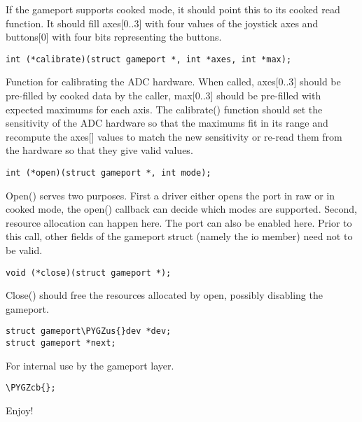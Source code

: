 \documentclass[a4paper,8pt,english]{sphinxmanual}
\def\PYGZus{\char`\_}
\def\PYGZcb{\char`\}}
\begin{document}
If the gameport supports cooked mode, it should point this to its cooked
read function. It should fill axes{[}0..3{]} with four values of the joystick axes
and buttons{[}0{]} with four bits representing the buttons.

\begin{Verbatim}[commandchars=\\\{\}]
int (*calibrate)(struct gameport *, int *axes, int *max);
\end{Verbatim}

Function for calibrating the ADC hardware. When called, axes{[}0..3{]} should be
pre-filled by cooked data by the caller, max{[}0..3{]} should be pre-filled with
expected maximums for each axis. The calibrate() function should set the
sensitivity of the ADC hardware so that the maximums fit in its range and
recompute the axes{[}{]} values to match the new sensitivity or re-read them from
the hardware so that they give valid values.

\begin{Verbatim}[commandchars=\\\{\}]
int (*open)(struct gameport *, int mode);
\end{Verbatim}

Open() serves two purposes. First a driver either opens the port in raw or
in cooked mode, the open() callback can decide which modes are supported.
Second, resource allocation can happen here. The port can also be enabled
here. Prior to this call, other fields of the gameport struct (namely the io
member) need not to be valid.

\begin{Verbatim}[commandchars=\\\{\}]
void (*close)(struct gameport *);
\end{Verbatim}

Close() should free the resources allocated by open, possibly disabling the
gameport.

\begin{Verbatim}[commandchars=\\\{\}]
struct gameport\PYGZus{}dev *dev;
struct gameport *next;
\end{Verbatim}

For internal use by the gameport layer.

\begin{Verbatim}[commandchars=\\\{\}]
\PYGZcb{};
\end{Verbatim}

Enjoy!
\end{document}
